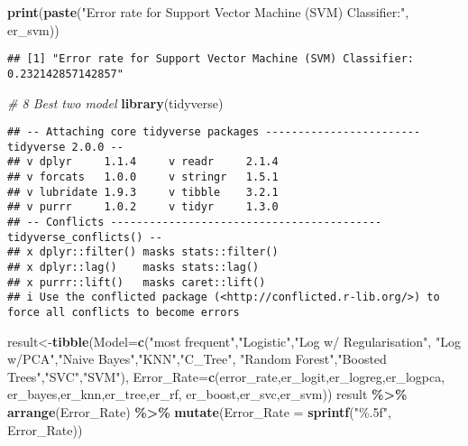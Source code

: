 \documentclass[
]{article}
\newenvironment{Shaded}{\begin{snugshade}}{\end{snugshade}}
\newcommand{\AttributeTok}[1]{\textcolor[rgb]{0.13,0.29,0.53}{#1}}
\newcommand{\CommentTok}[1]{\textcolor[rgb]{0.56,0.35,0.01}{\textit{#1}}}
\newcommand{\FunctionTok}[1]{\textcolor[rgb]{0.13,0.29,0.53}{\textbf{#1}}}
\newcommand{\NormalTok}[1]{#1}
\newcommand{\OtherTok}[1]{\textcolor[rgb]{0.56,0.35,0.01}{#1}}
\newcommand{\SpecialCharTok}[1]{\textcolor[rgb]{0.81,0.36,0.00}{\textbf{#1}}}
\newcommand{\StringTok}[1]{\textcolor[rgb]{0.31,0.60,0.02}{#1}}
\begin{document}
\begin{Shaded}
\begin{Highlighting}[]
\FunctionTok{print}\NormalTok{(}\FunctionTok{paste}\NormalTok{(}\StringTok{"Error rate for Support Vector Machine (SVM) Classifier:"}\NormalTok{, er\_svm))}
\end{Highlighting}
\end{Shaded}

\begin{verbatim}
## [1] "Error rate for Support Vector Machine (SVM) Classifier: 0.232142857142857"
\end{verbatim}

\begin{Shaded}
\begin{Highlighting}[]
\CommentTok{\# 8 Best two model}
\FunctionTok{library}\NormalTok{(tidyverse)}
\end{Highlighting}
\end{Shaded}

\begin{verbatim}
## -- Attaching core tidyverse packages ------------------------ tidyverse 2.0.0 --
## v dplyr     1.1.4     v readr     2.1.4
## v forcats   1.0.0     v stringr   1.5.1
## v lubridate 1.9.3     v tibble    3.2.1
## v purrr     1.0.2     v tidyr     1.3.0
## -- Conflicts ------------------------------------------ tidyverse_conflicts() --
## x dplyr::filter() masks stats::filter()
## x dplyr::lag()    masks stats::lag()
## x purrr::lift()   masks caret::lift()
## i Use the conflicted package (<http://conflicted.r-lib.org/>) to force all conflicts to become errors
\end{verbatim}

\begin{Shaded}
\begin{Highlighting}[]
\NormalTok{result}\OtherTok{\textless{}{-}}\FunctionTok{tibble}\NormalTok{(}\AttributeTok{Model=}\FunctionTok{c}\NormalTok{(}\StringTok{"most frequent"}\NormalTok{,}\StringTok{"Logistic"}\NormalTok{,}\StringTok{"Log w/ Regularisation"}\NormalTok{,}
                       \StringTok{"Log w/PCA"}\NormalTok{,}\StringTok{"Naive Bayes"}\NormalTok{,}\StringTok{"KNN"}\NormalTok{,}\StringTok{"C\_Tree"}\NormalTok{,}
                       \StringTok{"Random Forest"}\NormalTok{,}\StringTok{"Boosted Trees"}\NormalTok{,}\StringTok{"SVC"}\NormalTok{,}\StringTok{"SVM"}\NormalTok{),}
               \AttributeTok{Error\_Rate=}\FunctionTok{c}\NormalTok{(error\_rate,er\_logit,er\_logreg,er\_logpca,}
\NormalTok{                            er\_bayes,er\_knn,er\_tree,er\_rf,}
\NormalTok{                            er\_boost,er\_svc,er\_svm))}
\NormalTok{result }\SpecialCharTok{\%\textgreater{}\%} 
  \FunctionTok{arrange}\NormalTok{(Error\_Rate) }\SpecialCharTok{\%\textgreater{}\%} 
  \FunctionTok{mutate}\NormalTok{(}\AttributeTok{Error\_Rate =} \FunctionTok{sprintf}\NormalTok{(}\StringTok{"\%.5f"}\NormalTok{, Error\_Rate))}
\end{Highlighting}
\end{Shaded}
\end{document}
